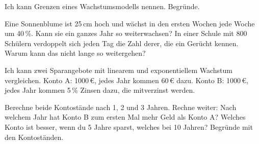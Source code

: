 \begin{aufgabe}{Ich kann Grenzen eines Wachstumsmodells nennen.}
Begründe.
\begin{teile}
\teil Eine Sonnenblume ist 25\,cm hoch und wächst in den ersten Wochen jede Woche um 40\,\%. Kann sie ein ganzes Jahr so weiterwachsen?
\teil In einer Schule mit 800 Schülern verdoppelt sich jeden Tag die Zahl derer, die ein Gerücht kennen. Warum kann das nicht lange so weitergehen?
\end{teile}
\end{aufgabe}

\begin{aufgabe}{Ich kann zwei Sparangebote mit linearem und exponentiellem Wachstum vergleichen.}
Konto A: 1000\,€, jedes Jahr kommen 60\,€ dazu. \quad Konto B: 1000\,€, jedes Jahr kommen 5\,\% Zinsen dazu, die mitverzinst werden.
\begin{teile}
\teil Berechne beide Kontostände nach 1, 2 und 3 Jahren.
\teil Rechne weiter: Nach welchem Jahr hat Konto B zum ersten Mal mehr Geld als Konto A?
\teil Welches Konto ist besser, wenn du 5 Jahre sparst, welches bei 10 Jahren? Begründe mit den Kontoständen.
\end{teile}
\end{aufgabe}
